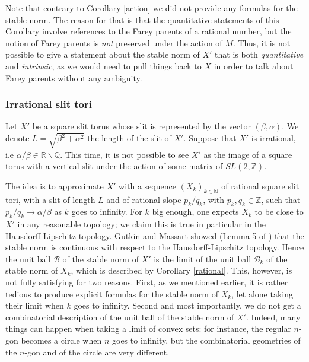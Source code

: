 \documentclass{article}
\newcommand{\NN}{\mathbb{N}}
\newcommand{\QQ}{\mathbb{Q}}
\newcommand{\RR}{\mathbb{R}}
\newcommand{\ZZ}{\mathbb{Z}}
\newcommand{\Bb}{\mathcal{B}}
\theoremstyle{definition}
\begin{document}
Note that contrary to Corollary \ref{action} we did not provide any formulas for the stable norm. The reason for that is that the quantitative statements of this Corollary involve references to the Farey parents of a rational number, but the notion of Farey parents is \emph{not} preserved under the action of $M$. Thus, it is not possible to give a statement about the stable norm of $X'$ that is both \emph{quantitative} and \emph{intrinsic}, as we would need to pull things back to $X$ in order to talk about Farey parents without any ambiguity.

\subsubsection{Irrational slit tori}

Let $X'$ be a square slit torus whose slit is represented by the vector $(\beta,\alpha)$. We denote $L= \sqrt{\beta^2 + \alpha^2}$ the length of the slit of $X'$. Suppose that $X'$ is irrational, i.e $\alpha/\beta \in \RR \backslash\QQ$.
This time, it is not possible to see $X'$ as the image of a square torus with a vertical slit under the action of some matrix of $SL(2,\ZZ)$. \newline 

The idea is to approximate $X'$ with a sequence $(X_k)_{k\in \NN}$ of rational square slit tori, with a slit of length $L$ and of rational slope $p_k/q_k$, with $p_k,q_k\in \ZZ$, such that $p_k/q_k\longrightarrow \alpha/\beta$ as $k$ goes to infinity.
For $k$ big enough, one expects $X_k$ to be close to $X'$ in any reasonable topology; we claim this is true in particular in the Hausdorff-Lipschitz topology. Gutkin and Massart showed (Lemma 5 of \cite{Gut-Mas}) that the stable norm is continuous with respect to the Hausdorff-Lipschitz topology. Hence the unit ball $\Bb$ of the stable norm of $X'$ is the limit of the unit ball $\Bb_k$ of the stable norm of $X_k$, which is described by Corollary \ref{rational}. This, however, is not fully satisfying for two reasons. First, as we mentioned earlier, it is rather tedious to produce explicit formulas for the stable norm of $X_k$, let alone taking their limit when $k$ goes to infinity. Second and most importantly, we do not get a combinatorial description of the unit ball of the stable norm of $X'$. Indeed, many things can happen when taking a limit of convex sets: for instance, the regular $n$-gon becomes a circle when $n$ goes to infinity, but the combinatorial geometries of the $n$-gon and of the circle are very different. \newline 
\end{document}
